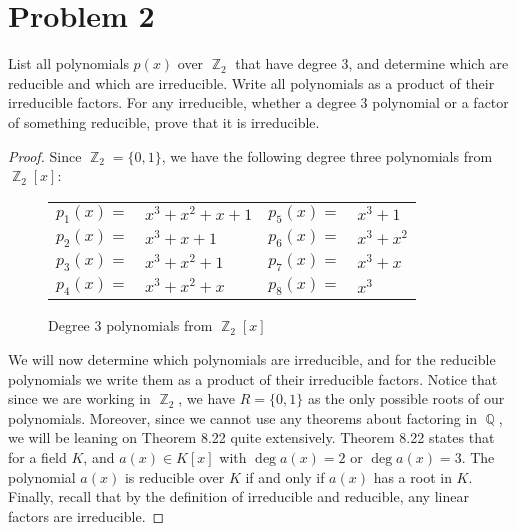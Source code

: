 \documentclass[letterpaper, 12pt]{amsart}
\DeclareMathOperator{\Z}{\mathbb{Z}}
\DeclareMathOperator{\Q}{\mathbb{Q}}
\begin{document}
	\section*{Problem 2}
	\label{sec:problem_2}
	List all polynomials $p(x)$ over $\Z_{2}$ that have degree 3, and determine which are reducible and which are irreducible.
	Write all polynomials as a product of their irreducible factors.
	For any irreducible, whether a degree 3 polynomial or a factor of something reducible, prove that it is irreducible.

	\begin{proof}
	Since $\Z_{2} = \{ 0,1 \}$, we have the following degree three polynomials from $\Z_{2}[x]$:

		\begin{figure}[h]
			\begin{tabular}{rlrl}
			$p_{1}(x) =$ & $x^{3} + x^{2} + x + 1$ & $p_{5}(x) =$ & $x^{3} + 1$ \\
			$p_{2}(x) =$ & $x^{3} + x + 1$ & $p_{6}(x) =$ & $x^{3} + x^{2}$ \\
			$p_{3}(x) =$ & $x^{3} + x^{2} + 1$ & $p_{7}(x) =$ & $x^{3} + x$ \\
			$p_{4}(x) =$ & $x^{3} + x^{2} + x$ & $p_{8}(x) =$ & $x^{3}$ 
			\end{tabular}
			\caption{Degree 3 polynomials from $\Z_{2}[x]$}
			\label{deg3polys}
		\end{figure}

	We will now determine which polynomials are irreducible, and for the reducible polynomials we write them as a product of their irreducible factors.
	Notice that since we are working in $\Z_{2}$, we have $R = \{ 0,1 \}$ as the only possible roots of our polynomials.
	Moreover, since we cannot use any theorems about factoring in $\Q$, we will be leaning on Theorem 8.22 quite extensively.
	Theorem 8.22 states that for a field $K$, and $a(x) \in K[x]$ with $\deg{a(x)} = 2$ or $\deg{a(x)} = 3$.
	The polynomial $a(x)$ is reducible over $K$ if and only if $a(x)$ has a root in $K$.
	Finally, recall that by the definition of irreducible and reducible, any linear factors are irreducible.


\end{proof}
\end{document}
